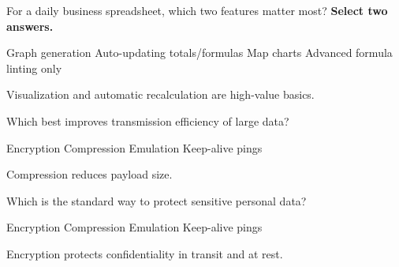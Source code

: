 \question[5]
For a daily business spreadsheet, which two features matter most? \textbf{Select two answers.}
\begin{checkboxes}
  \CorrectChoice Graph generation
  \CorrectChoice Auto-updating totals/formulas
  \choice Map charts
  \choice Advanced formula linting only
\end{checkboxes}
\begin{solution}
  Visualization and automatic recalculation are high-value basics.
\end{solution}

\question[5]
Which best improves transmission efficiency of large data?
\begin{choices}
  \choice Encryption
  \CorrectChoice Compression
  \choice Emulation
  \choice Keep-alive pings
\end{choices}
\begin{solution}
  Compression reduces payload size.
\end{solution}

\question[5]
Which is the standard way to protect sensitive personal data?
\begin{choices}
  \CorrectChoice Encryption
  \choice Compression
  \choice Emulation
  \choice Keep-alive pings
\end{choices}
\begin{solution}
  Encryption protects confidentiality in transit and at rest.
\end{solution}

